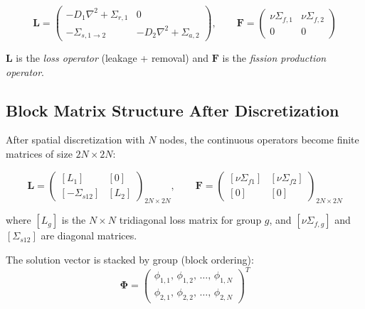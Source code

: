 \documentclass[12pt,a4paper]{article}
\newcommand{\sigr}[1]{\Sigma_{r,#1}}
\newcommand{\siga}[1]{\Sigma_{a,#1}}
\newcommand{\sigs}[2]{\Sigma_{s,#1\to#2}}
\newcommand{\sigf}[1]{\nu\Sigma_{f,#1}}
\newcommand{\diff}[1]{D_{#1}}
\begin{document}
\begin{equation}
  \mathbf{L} =
  \begin{pmatrix}
    -\diff{1}\nabla^2 + \sigr{1} & 0 \\
    -\sigs{1}{2} & -\diff{2}\nabla^2 + \siga{2}
  \end{pmatrix},
  \qquad
  \mathbf{F} =
  \begin{pmatrix}
    \sigf{1} & \sigf{2} \\
    0 & 0
  \end{pmatrix}
\end{equation}

$\mathbf{L}$ is the \textit{loss operator} (leakage + removal) and
$\mathbf{F}$ is the \textit{fission production operator}.

\subsection{Block Matrix Structure After Discretization}

After spatial discretization with $N$ nodes, the continuous operators
become finite matrices of size $2N \times 2N$:

\begin{equation}
  \mathbf{L} =
  \begin{pmatrix}
    [L_1] & [0] \\
    [-\Sigma_{s12}] & [L_2]
  \end{pmatrix}_{2N\times 2N},
  \qquad
  \mathbf{F} =
  \begin{pmatrix}
    [\nu\Sigma_{f1}] & [\nu\Sigma_{f2}] \\
    [0] & [0]
  \end{pmatrix}_{2N\times 2N}
  \label{eq:block}
\end{equation}

where $[L_g]$ is the $N\times N$ tridiagonal loss matrix for group $g$,
and $[\nu\Sigma_{f,g}]$ and $[\Sigma_{s12}]$ are diagonal matrices.

The solution vector is stacked by group (block ordering):
\begin{equation}
  \bm{\Phi} =
  \begin{pmatrix}
    \phi_{1,1},\, \phi_{1,2},\,\ldots,\, \phi_{1,N} \\
    \phi_{2,1},\, \phi_{2,2},\,\ldots,\, \phi_{2,N}
  \end{pmatrix}^T
\end{equation}

\end{document}
